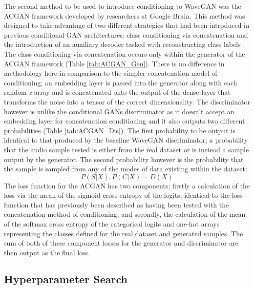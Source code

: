 \documentclass[a4paper, titlepage]{article}
\begin{document}
The second method to be used to introduce conditioning to WaveGAN was the \ac{ACGAN} framework developed by researchers at Google Brain.
This method was designed to take advantage of two different strategies that had been introduced in previous conditional \ac{GAN} architectures: class conditioning via concatenation and the introduction of an auxiliary decoder tasked with reconstructing class labels \citep{2016arXiv161009585O}.
\newline
\newline
The class conditioning via concatenation occurs only within the generator of the \ac{ACGAN} framework (Table \ref{tab:ACGAN_Gen}).
There is no difference in methodology here in comparison to the simpler concatenation model of conditioning; an embedding layer is passed into the generator along with each random \textit{z} array and is concatenated onto the output of the dense layer that transforms the noise into a tensor of the correct dimensionality.
\newline
\newline
The discriminator however is unlike the conditional GANs discriminator as it doesn't accept an embedding layer for concatenation conditioning and it also outputs two different probabilities (Table \ref{tab:ACGAN_Dis}).
The first probability to be output is identical to that produced by the baseline WaveGAN discriminator; a probability that the audio sample tested is either from the real dataset or is instead a sample output by the generator.
The second probability however is the probability that the sample is sampled from any of the modes of data existing within the dataset:
\newline
%
\begin{equation}
  P(S|X), P(C|X) = D(X)
\end{equation}
%
\newline
The loss function for the \ac{ACGAN} has two components; firstly a calculation of the loss via the mean of the sigmoid cross entropy of the logits, identical to the loss function that has previously been described as having been tested with the concatenation method of conditioning; and secondly, the calculation of the mean of the softmax cross entropy of the categorical logits and one-hot arrays representing the classes defined for the real dataset and generated samples.
The sum of both of these component losses for the generator and discriminator are then output as the final loss.

\subsection{Hyperparameter Search}
\end{document}

